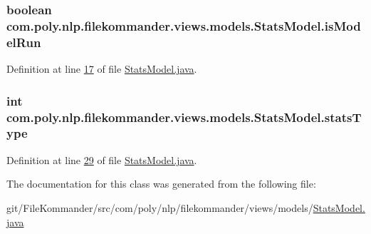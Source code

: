 \hypertarget{classcom_1_1poly_1_1nlp_1_1filekommander_1_1views_1_1models_1_1_stats_model_a3ac8d8b82975c5631fc65f47121cbfe7}{
\subsubsection[{is\-Model\-Run}]{\setlength{\rightskip}{0pt plus 5cm}boolean com.\-poly.\-nlp.\-filekommander.\-views.\-models.\-Stats\-Model.\-is\-Model\-Run\hspace{0.3cm}{\ttfamily [private]}}}\label{classcom_1_1poly_1_1nlp_1_1filekommander_1_1views_1_1models_1_1_stats_model_a3ac8d8b82975c5631fc65f47121cbfe7}


Definition at line \hyperlink{L17}{17} of file \hyperlink{}{Stats\-Model.\-java}.

\hypertarget{classcom_1_1poly_1_1nlp_1_1filekommander_1_1views_1_1models_1_1_stats_model_aa8aff56dba5f42c2f1f1b0452a461d0a}{
\subsubsection[{stats\-Type}]{\setlength{\rightskip}{0pt plus 5cm}int com.\-poly.\-nlp.\-filekommander.\-views.\-models.\-Stats\-Model.\-stats\-Type\hspace{0.3cm}{\ttfamily [private]}}}\label{classcom_1_1poly_1_1nlp_1_1filekommander_1_1views_1_1models_1_1_stats_model_aa8aff56dba5f42c2f1f1b0452a461d0a}


Definition at line \hyperlink{L29}{29} of file \hyperlink{}{Stats\-Model.\-java}.



The documentation for this class was generated from the following file\-:\begin{DoxyCompactItemize}
\item 
git/\-File\-Kommander/src/com/poly/nlp/filekommander/views/models/\hyperlink{_stats_model_8java}{Stats\-Model.\-java}\end{DoxyCompactItemize}
